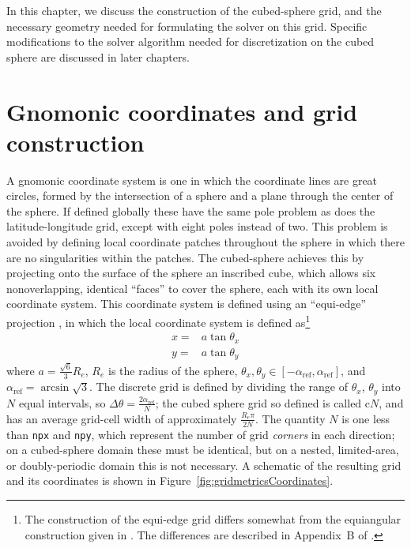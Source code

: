 \documentclass[10pt,letterpaper,margin=1in]{memoir}
\begin{document}
In this chapter, we discuss the construction of the cubed-sphere grid, and the necessary geometry needed for formulating the solver on this grid. Specific modifications to the solver algorithm needed for discretization on the cubed sphere are discussed in later chapters.

\section{Gnomonic coordinates and grid construction}

A gnomonic coordinate system is one in which the coordinate lines are great circles, formed by the intersection of a sphere and a plane through the center of the sphere. If defined globally these have the same pole problem as does the latitude-longitude grid, except with eight poles instead of two. This problem is avoided by defining local coordinate patches throughout the sphere in which there are no singularities within the patches. The cubed-sphere achieves this by projecting onto the surface of the sphere an inscribed cube, which allows six nonoverlapping, identical ``faces'' to cover the sphere, each with its own local coordinate system. This coordinate system is defined using an ``equi-edge'' projection \citep{XChen2021}, in which the local coordinate system is defined as\footnote{The construction of the equi-edge grid differs somewhat from the equiangular construction given in \citet{PL07}. The differences are described in Appendix~B of \citep{XChen2021}.}
\begin{equation}
\begin{split}
x = & a \tan \theta_x \\
y = & a \tan \theta_y
\end{split}
\end{equation}
where $a = \frac{\sqrt{6}}{3}R_e$, $R_e$ is the radius of the sphere, $\theta_x, \theta_y \in \left [ -\alpha_\text{ref}, \alpha_\text{ref} \right ]$, and $\alpha_\text{ref} = \arcsin \sqrt{3}$. The discrete grid is defined by dividing the range of $\theta_x$, $\theta_y$ into $N$ equal intervals, so $\Delta \theta = \frac{2\alpha_\text{ref}}{N}$; the cubed sphere grid so defined is called c$N$, and has an average grid-cell width of approximately $\frac{R_e \pi}{2N}$. The quantity $N$ is one less than \texttt{npx} and \texttt{npy}, which represent the number of grid \textit{corners} in each direction; on a cubed-sphere domain these must be identical, but on a nested, limited-area, or doubly-periodic domain this is not necessary. A schematic of the resulting grid and its coordinates is shown in Figure~\ref{fig:gridmetricsCoordinates}.
\end{document}
